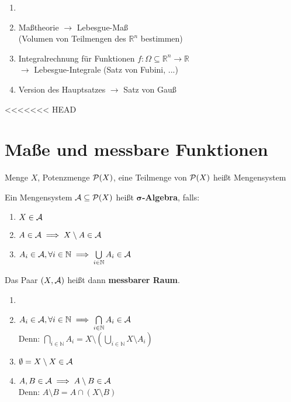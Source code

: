 \documentclass[11pt,a4paper,fleqn,openany]{report}
\begin{document}
  \begin{goals}
    \begin{enumerate}
      \item[]
      \item Maßtheorie $\to$ Lebesgue-Maß\\(Volumen von Teilmengen des $\mathbb{R}^n$ bestimmen)
      \item Integralrechnung für Funktionen $f:\Omega \subseteq \mathbb{R}^n \to \mathbb{R}$\\$\to$ Lebesgue-Integrale (Satz von Fubini, ...)
      \item Version des Hauptsatzes $\to$ Satz von Gauß 
    \end{enumerate}
  \end{goals}

<<<<<<< HEAD
  \chapter{Maße und messbare Funktionen}

    \begin{notation}
      Menge $X$, Potenzmenge $\mathcal{P}(X)$, eine Teilmenge von $\mathcal{P}(X)$ heißt Mengensystem
    \end{notation}

    \begin{definition}
      Ein Mengensystem $\mathcal{A} \subseteq \mathcal{P}(X)$ heißt \textbf{$\bm{\sigma}$-Algebra}, falls:
      \begin{enumerate}[label=(\roman*)]
        \item $X \in \mathcal{A}$
        \item $A \in \mathcal{A} \implies X \setminus A \in \mathcal{A}$
        \item $A_i \in \mathcal{A}, \forall i \in \mathbb{N} \implies \bigcup\limits_{i \in \mathbb{N}} A_i \in \mathcal{A}$
      \end{enumerate}
      Das Paar $(X, \mathcal{A})$ heißt dann \textbf{messbarer Raum}.
    \end{definition}

    \begin{remark}
      \begin{enumerate}
        \item[]
        \item $A_i \in \mathcal{A}, \forall i \in \mathbb{N} \implies \bigcap\limits_{i \in \mathbb{N}} A_i \in \mathcal{A}$\\
              Denn: $\bigcap\limits_{i \in \mathbb{N}} A_i = X \setminus (\bigcup\limits_{i \in \mathbb{N}} X \setminus A_i)$
        \item $\emptyset = X \setminus X \in \mathcal{A}$
        \item $A,B \in \mathcal{A} \implies A \setminus B \in \mathcal{A}$\\
              Denn: $A \setminus B = A \cap (X \setminus B)$
      \end{enumerate}
    \end{remark}
\end{document}
